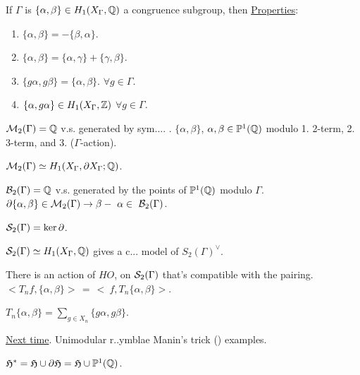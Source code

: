 \documentclass[]{article}
\begin{document}
\begin{theorem}
	 If $\Gamma$ is $\{\alpha,\beta\} \in H_1(X_\Gamma,\mathbb{Q})$ a congruence subgroup, then
	\ul{Properties}:
	\begin{enumerate}
		\item $\{\alpha,\beta\} = - \{\beta,\alpha\}$. 
		\item $\{\alpha,\beta\} = \{\alpha,\gamma\} + \{\gamma,\beta\}$. 
		\item $\{g\alpha,g\beta\} = \{\alpha,\beta\}$. $\forall g\in\Gamma$.
		\item $\{\alpha,g\alpha\} \in H_1(X_\Gamma,\mathbb{Z})$ $\forall g\in\Gamma$.
	\end{enumerate}
\end{theorem}
\begin{definition}
	$\mathcal{M}_2(\Gamma) = \mathbb{Q}$ v.s. generated by sym.... . $\{\alpha,\beta\}$, $\alpha,\beta\in \mathbb{P}^1(\mathbb{Q})$ modulo 1. 2-term, 2. 3-term, and 3. ($\Gamma$-action).
\end{definition}
\begin{theorem}
	[Manin] $\mathcal{M}_2(\Gamma) \simeq H_1(X_\Gamma, \partial X_\Gamma; \mathbb{Q})$.
\end{theorem}
\begin{definition}
	$\mathcal{B}_2(\Gamma) = \mathbb{Q}$ v.s. generated by the points of $\mathbb{P}^1(\mathbb{Q})$ modulo $\Gamma$. $\partial \{\alpha,\beta\} \in\mathcal{M}_2(\Gamma) \rightarrow \beta-~\alpha \in~\mathcal{B}_2(\Gamma)$.
\end{definition}
\begin{definition}
	$\mathcal{S}_2(\Gamma) = \ker\partial$.
\end{definition}
\begin{theorem}
	[Manin] $\mathcal{S}_2(\Gamma) \simeq H_1 (X_\Gamma,\mathbb{Q})$ gives a c... model of $S_2(\Gamma)^\vee$.
\end{theorem}
\begin{fact}
	There is an action of $HO$, on $\mathcal{S}_2(\Gamma)$ that's compatible with the pairing. $<T_nf, \{\alpha,\beta\}> \,=\, <~f,T_n\{\alpha,\beta\}>$.
\end{fact}
\begin{definition}
	$T_n\{\alpha,\beta\} = \sum_{g\in X_n} \{g\alpha, g\beta\}$.
\end{definition}

\ul{Next time}. Unimodular r..ymblae Manin's trick () examples.

$\frak{H}^* = \frak{H}\cup \partial \frak{H} = \frak{H} \cup \mathbb{P}^1(\mathbb{Q})$.
\end{document}
